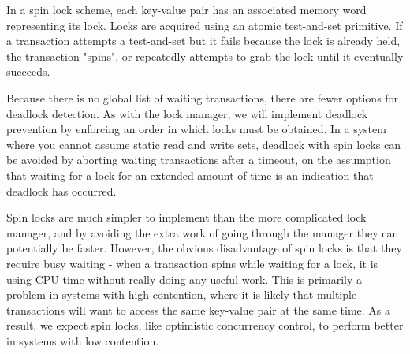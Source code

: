 In a spin lock scheme, each key-value pair has an associated memory word representing its lock. Locks are acquired using an atomic test-and-set primitive. If a transaction attempts a test-and-set but it fails because the lock is already held, the transaction "spins", or repeatedly attempts to grab the lock until it eventually succeeds.

Because there is no global list of waiting transactions, there are fewer options for deadlock detection. As with the lock manager, we will implement deadlock prevention by enforcing an order in which locks must be obtained. In a system where you cannot assume static read and write sets, deadlock with spin locks can be avoided by aborting waiting transactions after a timeout, on the assumption that waiting for a lock for an extended amount of time is an indication that deadlock has occurred.

Spin locks are much simpler to implement than the more complicated lock manager, and by avoiding the extra work of going through the manager they can potentially be faster. However, the obvious disadvantage of spin locks is that they require busy waiting - when a transaction spins while waiting for a lock, it is using CPU time without really doing any useful work. This is primarily a problem in systems with high contention, where it is likely that multiple transactions will want to access the same key-value pair at the same time. As a result, we expect spin locks, like optimistic concurrency control, to perform better in systems with low contention.